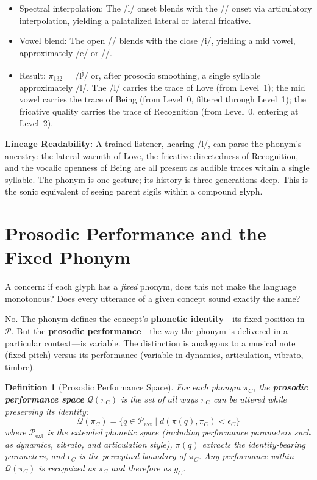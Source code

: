 \documentclass[12pt, letterpaper]{book}
\def\equiv{=}%
\def\mathfrak#1{#1}%
\newtheorem{definition}{Definition}[chapter]
\begin{document}
\begin{itemize}
    \item Spectral interpolation: The /l/ onset blends with the /\textesh/ onset via articulatory interpolation, yielding a palatalized lateral or lateral fricative.
    \item Vowel blend: The open /\textscripta/ blends with the close /i/, yielding a mid vowel, approximately /e/ or /\textepsilon/.
    \item Result: $\pi_{132}$ = /l\textsuperscript{j}\textepsilon/ or, after prosodic smoothing, a single syllable approximately /l\textesh\textepsilon/. The /l/ carries the trace of Love (from Level~1); the mid vowel carries the trace of Being (from Level~0, filtered through Level~1); the fricative quality carries the trace of Recognition (from Level~0, entering at Level~2).
\end{itemize}

\noindent\textbf{Lineage Readability:} A trained listener, hearing /l\textesh\textepsilon/, can parse the phonym's ancestry: the lateral warmth of Love, the fricative directedness of Recognition, and the vocalic openness of Being are all present as audible traces within a single syllable. The phonym is one gesture; its history is three generations deep. This is the sonic equivalent of seeing parent sigils within a compound glyph.


\section{Prosodic Performance and the Fixed Phonym}

A concern: if each glyph has a \textit{fixed} phonym, does this not make the language monotonous? Does every utterance of a given concept sound exactly the same?

No. The phonym defines the concept's \textbf{phonetic identity}---its fixed position in $\mathcal{P}$. But the \textbf{prosodic performance}---the way the phonym is delivered in a particular context---is variable. The distinction is analogous to a musical note (fixed pitch) versus its performance (variable in dynamics, articulation, vibrato, timbre).

\begin{definition}[Prosodic Performance Space]\label{def:prosodic-performance}
For each phonym $\pi_C$, the \textbf{prosodic performance space} $\mathcal{Q}(\pi_C)$ is the set of all ways $\pi_C$ can be uttered while preserving its identity:
\[
\mathcal{Q}(\pi_C) \equiv \{q \in \mathcal{P}_{\text{ext}} \mid d(\pi(q), \pi_C) < \epsilon_C\}
\]
where $\mathcal{P}_{\text{ext}}$ is the extended phonetic space (including performance parameters such as dynamics, vibrato, and articulation style), $\pi(q)$ extracts the identity-bearing parameters, and $\epsilon_C$ is the perceptual boundary of $\pi_C$. Any performance within $\mathcal{Q}(\pi_C)$ is recognized as $\pi_C$ and therefore as $\mathfrak{g}_C$.
\end{definition}
\end{document}
